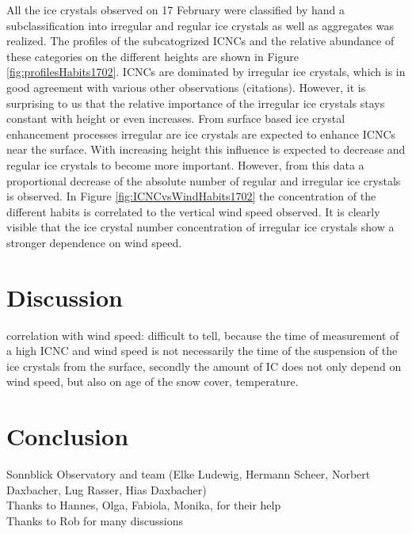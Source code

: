 \documentclass[draft,linenumbers]{agujournal}
\begin{document}
All the ice crystals observed on 17 February were classified by hand a subclassification into irregular and regular ice crystals as well as aggregates was realized. The profiles of the subcatogrized ICNCs and the relative abundance of these categories on the different heights are shown in Figure \ref{fig:profilesHabits1702}. ICNCs are dominated by irregular ice crystals, which is in good agreement with various other observations (citations). However, it is surprising to us that the relative importance of the irregular ice crystals stays constant with height or even increases. From surface based ice crystal enhancement processes irregular are ice crystals are expected to enhance ICNCs near the surface. With increasing height this influence is expected to decrease and regular ice crystals to become more important. However, from this data a proportional decrease of the absolute number of regular and irregular ice crystals is observed. In Figure \ref{fig:ICNCvsWindHabits1702} the concentration of the different habits is correlated to the vertical wind speed observed. It is clearly visible that the ice crystal number concentration of irregular ice crystals show a stronger dependence on wind speed. 

\section{Discussion}
\label{Discussion}

correlation with wind speed: difficult to tell, because the time of measurement of a high ICNC and wind speed is not necessarily the time of the suspension of the ice crystals from the surface, secondly the amount of IC does not only depend on wind speed, but also on age of the snow cover, temperature.

\section{Conclusion}
\label{Summary}


\begin{acronyms}
\end{acronyms}


\acknowledgments
Sonnblick Observatory and team (Elke Ludewig, Hermann Scheer, Norbert Daxbacher, Lug Rasser, Hias Daxbacher)\\
Thanks to Hannes, Olga, Fabiola, Monika, for their help\\
Thanks to Rob for many discussions
\end{document}
